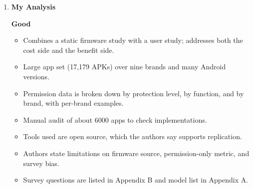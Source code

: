 \documentclass[11pt,a4paper]{article}
\newcommand{\entrypart}[1]{\textbf{\color{accent}#1}\par\vspace{2pt}}
\begin{document}
\begin{enumerate}
    \item \entrypart{My Analysis}

    \textbf{Good}
    \begin{itemize}[leftmargin=*, itemsep=1pt, topsep=2pt]
        \item Combines a static firmware study with a user study; addresses both the cost side and the benefit side.
        \item Large app set (17,179 APKs) over nine brands and many Android versions.
        \item Permission data is broken down by protection level, by function, and by brand, with per-brand examples.
        \item Manual audit of about 6000 apps to check implementations.
        \item Tools used are open source, which the authors say supports replication.
        \item Authors state limitations on firmware source, permission-only metric, and survey bias.
        \item Survey questions are listed in Appendix B and model list in Appendix A.
    \end{itemize}


\end{enumerate}
\end{document}

